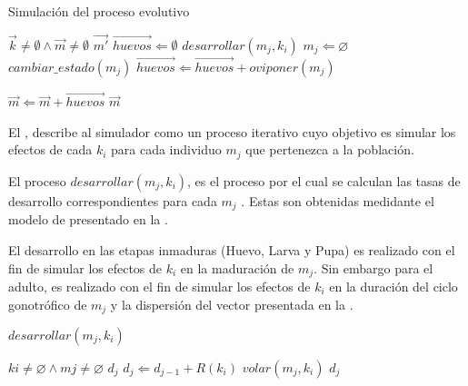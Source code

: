 \begin{algorithm}
\caption{Simulación del proceso evolutivo}
\label{alg:simulador-evolutivo}
\begin{algorithmic}[1]
    \REQUIRE $\vec{k}\neq \emptyset \land \vec{m} \neq \emptyset$
    \ENSURE $\vec{m'}$
        \STATE $\vec{huevos} \Leftarrow \emptyset$
            \STATE $desarrollar(m_{j}, k_{i})$
                \STATE {}
                \STATE $m_{j} \Leftarrow \varnothing $
                \STATE $ cambiar\_estado(m_{j}) $
                \STATE $\vec{huevos} \Leftarrow \vec{huevos} + oviponer(m_{j})$
            \ENDIF
        \ENDFOR

            \STATE {}
            \STATE $\vec{m} \Leftarrow  \vec{m} + \vec{huevos}$
        \ENDIF
    \ENDFOR
    \RETURN $\vec{m}$
\end{algorithmic}
\end{algorithm}

El , describe al simulador como un proceso iterativo cuyo objetivo
es simular los efectos de cada $k_{i}$ para cada individuo $m_{j}$ que pertenezca a la población.

El proceso $desarrollar(m_{j}, k_{i})$, es el proceso por el cual se calculan las tasas de
desarrollo correspondientes para cada $m_{j}$ . Estas son obtenidas medidante el modelo de
\citet{sharpe1977reaction} presentado en la .

El desarrollo en las etapas inmaduras (Huevo, Larva y Pupa) es realizado con el fin de simular los
efectos de $k_{i}$ en la maduración de $m_{j}$. Sin embargo para el adulto, es realizado con el fin
de simular los efectos de $k_{i}$ en la duración del ciclo gonotrófico de $m_{j}$ y la dispersión
del vector presentada en la .


\begin{algorithm}
\caption{$desarrollar(m_{j}, k_{i})$}
\label{alg:desarrollo}
\begin{algorithmic}[1]
    \REQUIRE $ k{i} \neq \varnothing \land m{j} \neq \varnothing$
    \ENSURE $d_{j}$
            \STATE $d_{j} \Leftarrow d_{j -1} + R(k_{i})$
            \STATE $volar(m_{j}, k_{i})$
            \ENDIF
    \RETURN $d_{j}$
\end{algorithmic}
\end{algorithm}

